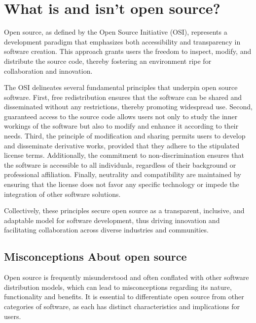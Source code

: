 \section{What is and isn’t open source?}


Open source, as defined by the Open Source Initiative (OSI), represents a development paradigm that emphasizes both accessibility and transparency in software creation. 
This approach grants users the freedom to inspect, modify, and distribute the source code, thereby fostering an environment ripe for collaboration and innovation.

The OSI delineates several fundamental principles that underpin open source software. 
First, free redistribution ensures that the software can be shared and disseminated without any restrictions, thereby promoting widespread use. 
Second, guaranteed access to the source code allows users not only to study the inner workings of the software but also to modify and enhance it according to their needs. 
Third, the principle of modification and sharing permits users to develop and disseminate derivative works, provided that they adhere to the stipulated license terms. 
Additionally, the commitment to non-discrimination ensures that the software is accessible to all individuals, regardless of their background or professional affiliation. 
Finally, neutrality and compatibility are maintained by ensuring that the license does not favor any specific technology or impede the integration of other software solutions.

Collectively, these principles secure open source as a transparent, inclusive, and adaptable model for software development, 
thus driving innovation and facilitating collaboration across diverse industries and communities.

\cite{Open_Source_Initiative_OS_definition}

\subsection{Misconceptions About open source}

Open source is frequently misunderstood and often conflated with other software distribution models, which can lead to misconceptions regarding its nature, 
functionality and benefits. It is essential to differentiate open source from other categories of software, as each has distinct characteristics and implications for users.

